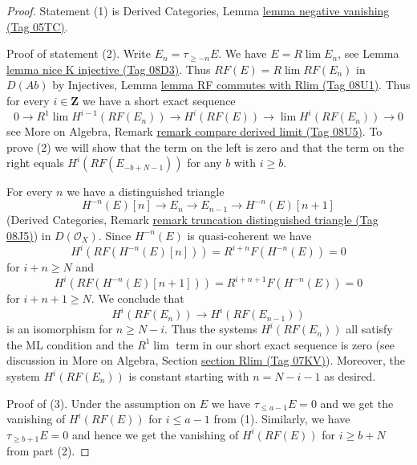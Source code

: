 \documentclass{amsart}
\theoremstyle{plain}
\theoremstyle{definition}
\theoremstyle{remark}
\numberwithin{equation}{subsection}
\def\lim{\mathop{\mathrm{lim}}\nolimits}
\begin{document}
\begin{proof}
Statement (1) is
Derived Categories, Lemma \href{https://stacks.math.columbia.edu/tag/05TC}{lemma negative vanishing (Tag 05TC)}.

\medskip\noindent
Proof of statement (2). Write $E_n = \tau_{\geq -n}E$. We have
$E = R\lim E_n$, see Lemma \href{https://stacks.math.columbia.edu/tag/08D3}{lemma nice K injective (Tag 08D3)}. Thus
$RF(E) = R\lim RF(E_n)$ in $D(\textit{Ab})$ by Injectives, Lemma
\href{https://stacks.math.columbia.edu/tag/08U1}{lemma RF commutes with Rlim (Tag 08U1)}. Thus for every $i \in \mathbf{Z}$
we have a short exact sequence
$$
0 \to R^1\lim H^{i - 1}(RF(E_n)) \to H^i(RF(E)) \to \lim H^i(RF(E_n)) \to 0
$$
see More on Algebra, Remark
\href{https://stacks.math.columbia.edu/tag/08U5}{remark compare derived limit (Tag 08U5)}.
To prove (2) we will show that the term on the left is zero
and that the term on the right equals $H^i(RF(E_{-b + N - 1}))$
for any $b$ with $i \geq b$.

\medskip\noindent
For every $n$ we have a distinguished triangle
$$
H^{-n}(E)[n] \to E_n \to E_{n - 1} \to H^{-n}(E)[n + 1]
$$
(Derived Categories, Remark
\href{https://stacks.math.columbia.edu/tag/08J5}{remark truncation distinguished triangle (Tag 08J5)})
in $D(\mathcal{O}_X)$. Since $H^{-n}(E)$ is quasi-coherent we have
$$
H^i(RF(H^{-n}(E)[n])) = R^{i + n}F(H^{-n}(E)) = 0
$$
for $i + n \geq N$ and
$$
H^i(RF(H^{-n}(E)[n + 1])) = R^{i + n + 1}F(H^{-n}(E)) = 0
$$
for $i + n + 1 \geq N$. We conclude that
$$
H^i(RF(E_n)) \to H^i(RF(E_{n - 1}))
$$
is an isomorphism for $n \geq N - i$. Thus the systems $H^i(RF(E_n))$ all
satisfy the ML condition and the $R^1\lim$ term in our short exact
sequence is zero (see discussion in
More on Algebra, Section \href{https://stacks.math.columbia.edu/tag/07KV}{section Rlim (Tag 07KV)}).
Moreover, the system $H^i(RF(E_n))$ is constant starting
with $n = N - i - 1$ as desired.

\medskip\noindent
Proof of (3). Under the assumption on $E$ we have
$\tau_{\leq a - 1}E = 0$ and we get the vanishing
of $H^i(RF(E))$ for $i \leq a - 1$ from (1).
Similarly, we have $\tau_{\geq b + 1}E = 0$ and hence
we get the vanishing of $H^i(RF(E))$ for $i \geq b + N$ from
part (2).
\end{proof}
\end{document}
